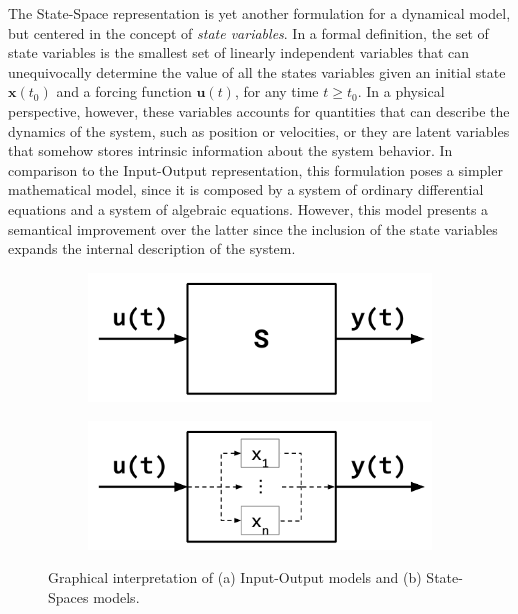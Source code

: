\documentclass[a4paper,11pt]{book}
\numberwithin{figure}{chapter}
\numberwithin{equation}{chapter}
\numberwithin{table}{chapter}
\theoremstyle{definition}
\begin{document}
The State-Space representation is yet another formulation for a dynamical model, but centered in the concept of \textit{state variables}. In a formal definition, the set of state variables is the smallest set of linearly independent variables that can unequivocally determine the value of all the states variables given an initial state $\bm{x}(t_0)$ and a forcing function $\bm{u}(t)$, for any time $t \geq t_0$. In a physical perspective, however, these variables accounts for quantities that can describe the dynamics of the system, such as position or velocities, or they are latent variables that somehow stores intrinsic information about the system behavior. In comparison to the Input-Output representation, this formulation poses a simpler mathematical model, since it is composed by a system of ordinary differential equations and a system of algebraic equations. However, this model presents a semantical improvement over the latter since the inclusion of the state variables expands the internal description of the system. 

\begin{figure}[ht] 
    \centering
    \begin{subfigure}{0.49\textwidth}
        \centering  
        \includegraphics[scale=0.7]{chapter2/model01}
        \caption{}  \label{fig:model01a}
    \end{subfigure}
    \begin{subfigure}{0.49\textwidth}   
    \centering
        \includegraphics[scale=0.7]{chapter2/model02}
        \caption{} \label{fig:model01b}
    \end{subfigure}
    
    \caption{Graphical interpretation of (a) Input-Output models and (b) State-Spaces models.} 
    \label{fig:model1}
\end{figure}
\end{document}
